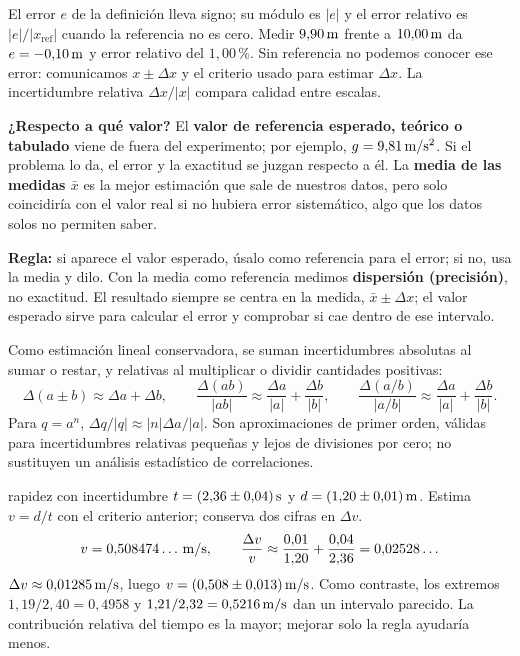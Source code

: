 \documentclass[11pt,a4paper]{article}
\begin{document}
El error $e$ de la definici\'on lleva signo;
su m\'odulo es $|e|$ y el error relativo es $|e|/|x_{\mathrm{ref}}|$ cuando la
referencia no es cero. Medir $9{,}90\,\mathrm{m}$ frente a $10{,}00\,\mathrm{m}$ da
$e=-0{,}10\,\mathrm{m}$ y error relativo del $1{,}00\,\text{\%}$.
Sin referencia no podemos conocer ese error: comunicamos $x\pm\Delta x$ y
el criterio usado para estimar $\Delta x$.
La incertidumbre relativa $\Delta x/|x|$ compara calidad entre escalas.

\begin{keybox}
\textbf{¿Respecto a qu\'e valor?} El \textbf{valor de referencia esperado,
te\'orico o tabulado} viene de fuera del experimento; por ejemplo,
$g=9{,}81\,\mathrm{m/s^2}$. Si el problema lo da, el error y la exactitud se juzgan
respecto a \'el. La \textbf{media de las medidas $\bar x$} es la mejor estimaci\'on
que sale de nuestros datos, pero solo coincidir\'ia con el valor real si no hubiera
error sistem\'atico, algo que los datos solos no permiten saber.

\textbf{Regla:} si aparece el valor esperado, \'usalo como referencia para el error;
si no, usa la media y dilo. Con la media como referencia medimos
\textbf{dispersi\'on (precisi\'on)}, no exactitud. El resultado siempre se centra
en la medida, $\bar x\pm\Delta x$; el valor esperado sirve para calcular el error y
comprobar si cae dentro de ese intervalo.
\end{keybox}

Como estimaci\'on lineal conservadora, se suman incertidumbres absolutas al sumar o
restar, y relativas al multiplicar o dividir cantidades positivas:
\[
\Delta(a\pm b)\approx\Delta a+\Delta b,\qquad
\frac{\Delta(ab)}{|ab|}\approx\frac{\Delta a}{|a|}+\frac{\Delta b}{|b|},\qquad
\frac{\Delta(a/b)}{|a/b|}\approx\frac{\Delta a}{|a|}+\frac{\Delta b}{|b|}.
\]
Para $q=a^n$, $\Delta q/|q|\approx |n|\Delta a/|a|$.
Son aproximaciones de primer orden, v\'alidas para incertidumbres relativas peque\~nas
y lejos de divisiones por cero; no sustituyen un an\'alisis estad\'istico de correlaciones.

\begin{exercisebox}{rapidez con incertidumbre}
$t=(2{,}36\pm0{,}04)\,\mathrm{s}$ y $d=(1{,}20\pm0{,}01)\,\mathrm{m}$.
Estima $v=d/t$ con el criterio anterior; conserva dos cifras en $\Delta v$.
\solutionblock
\[
v=0{,}508474\ldots\,\mathrm{m/s},\qquad
\frac{\Delta v}{v}\approx\frac{0{,}01}{1{,}20}+\frac{0{,}04}{2{,}36}=0{,}02528\ldots
\]
$\Delta v\approx0{,}01285\,\mathrm{m/s}$, luego $v=(0{,}508\pm0{,}013)\,\mathrm{m/s}$.
Como contraste, los extremos
$1{,}19/2{,}40=0{,}4958$ y $1{,}21/2{,}32=0{,}5216\,\mathrm{m/s}$ dan un intervalo parecido.
La contribuci\'on relativa del tiempo es la mayor; mejorar solo la regla ayudar\'ia menos.
\end{exercisebox}
\end{document}
